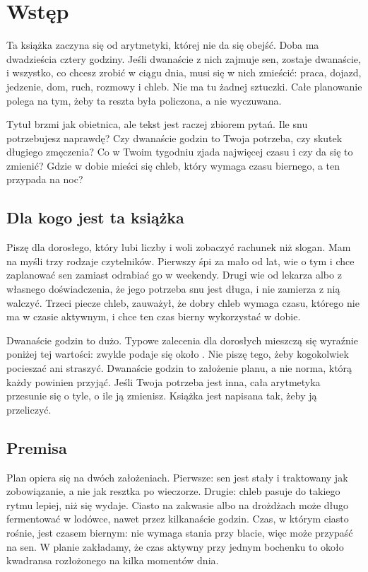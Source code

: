 \chapter*{Wstęp}

Ta książka zaczyna się od arytmetyki, której nie da się obejść. Doba ma dwadzieścia cztery godziny. Jeśli dwanaście z nich zajmuje sen, zostaje dwanaście, i wszystko, co chcesz zrobić w ciągu dnia, musi się w nich zmieścić: praca, dojazd, jedzenie, dom, ruch, rozmowy i chleb. Nie ma tu żadnej sztuczki. Całe planowanie polega na tym, żeby ta reszta była policzona, a nie wyczuwana.

Tytuł brzmi jak obietnica, ale tekst jest raczej zbiorem pytań. Ile snu potrzebujesz naprawdę? Czy dwanaście godzin to Twoja potrzeba, czy skutek długiego zmęczenia? Co w Twoim tygodniu zjada najwięcej czasu i czy da się to zmienić? Gdzie w dobie mieści się chleb, który wymaga czasu biernego, a ten przypada na noc?

\section*{Dla kogo jest ta książka}

Piszę dla dorosłego, który lubi liczby i woli zobaczyć rachunek niż slogan. Mam na myśli trzy rodzaje czytelników. Pierwszy śpi za mało od lat, wie o tym i chce zaplanować sen zamiast odrabiać go w weekendy. Drugi wie od lekarza albo z własnego doświadczenia, że jego potrzeba snu jest długa, i nie zamierza z nią walczyć. Trzeci piecze chleb, zauważył, że dobry chleb wymaga czasu, którego nie ma w czasie aktywnym, i chce ten czas bierny wykorzystać w dobie.

Dwanaście godzin to dużo. Typowe zalecenia dla dorosłych mieszczą się wyraźnie poniżej tej wartości: zwykle podaje się około . Nie piszę tego, żeby kogokolwiek pocieszać ani straszyć. Dwanaście godzin to założenie planu, a nie norma, którą każdy powinien przyjąć. Jeśli Twoja potrzeba jest inna, cała arytmetyka przesunie się o tyle, o ile ją zmienisz. Książka jest napisana tak, żeby ją przeliczyć.

\section*{Premisa}

Plan opiera się na dwóch założeniach. Pierwsze: sen jest stały i traktowany jak zobowiązanie, a nie jak resztka po wieczorze. Drugie: chleb pasuje do takiego rytmu lepiej, niż się wydaje. Ciasto na zakwasie albo na drożdżach może długo fermentować w lodówce, nawet przez kilkanaście godzin. Czas, w którym ciasto rośnie, jest czasem biernym: nie wymaga stania przy blacie, więc może przypaść na sen. W planie zakładamy, że czas aktywny przy jednym bochenku to około kwadransa rozłożonego na kilka momentów dnia.

